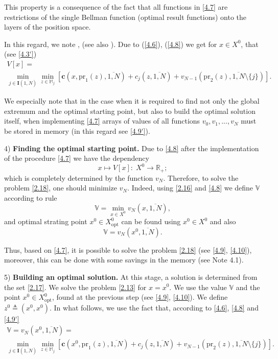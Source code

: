 \documentclass[10pt]{article}
\begin{document}
This property is a consequence of the fact
that all functions in
\eqref {4.7} are restrictions of the single Bellman function
(optimal result functions)
onto the layers of the position space.

In this regard, we note
\cite[$\S$4.9]{14}, \cite{18}
(see also \cite[(4.3.1)]{4}).
Due to (\ref{4.6}), (\ref{4.8})
we get for
$x \in X^0$,
that
(see \eqref{4.3'})
\begin{multline}
  \label{4.9'}
  V[x] = \\
  \min\limits_{j \in \mathbf{I}(\overline{1,N})} \min\limits_{z \in \mathbb{M}_j}
  [\mathbf{c}(x,\mathrm{pr}_1(z),\overline{1,N}) + c_j(z,\overline{1,N}) + v_{N-1}(\mathrm{pr}_2(z),\overline{1,N} \setminus \{j\})].
\end{multline}

We especially note that in the case
when it is required to find not only the global extremum
and the optimal starting point,
but also to build the optimal solution itself,
when implementing \eqref {4.7}
arrays of values of all functions
$v_0,v_1,...,v_N$
must be stored in memory
(in this regard see \eqref{4.9'}).

4) {\bf Finding the optimal starting point.}
Due to
\eqref{4.8}
after the implementation of the procedure
\eqref {4.7} we have the dependency
$$
  x \longmapsto V[x]:\;X^0 \longrightarrow \mathbb{R}_+;
$$
which is completely determined by the function
$v_N$.
Therefore, to solve the problem \eqref{2.18}, one should minimize
$v_N$.
Indeed,
using \eqref{2.16} and \eqref{4.8}
we define
$\mathbb{V}$
according to rule
\begin{equation}\label{4.9}
  \mathbb{V} = \min\limits_{x \in X^0} v_N(x,\overline{1,N}),
\end{equation}
and optimal strating point
$x^0 \in X^0_{\mathrm{opt}}$
can be found using
$x^0 \in X^0$ and also
\begin{equation}\label{4.10}
  \mathbb{V} = v_N(x^0,\overline{1,N}).
\end{equation}

Thus,
based on \eqref{4.7},
it is possible to
solve the problem \eqref {2.18}
(see \eqref{4.9}, \eqref {4.10}),
moreover,
this can be done with some savings in the memory
(see Note 4.1).

5) {\bf Building an optimal solution.}
At this stage, a solution is determined from the set \eqref{2.17}.
We solve the problem
\eqref{2.13}
for
$x=x^0$.
We use the value
$\mathbb{V}$
and the point
$x^0 \in X^0_{\mathrm{opt}}$,
found at the previous step
(see \eqref{4.9}, \eqref{4.10}).
We define $z^0 {\triangleq} (x^0,x^0)$.
In what follows, we use the fact that, according to
\eqref{4.6}, \eqref{4.8} and \eqref{4.9'}
\begin{multline}
  \label{4.11}
  \mathbb{V} = v_N(x^0,\overline{1,N}) = \\
  \min\limits_{j \in \mathbf{I}(\overline{1,N})}
  \min\limits_{z \in \mathbb{M}_j}
  [\mathbf{c}(x^0,\mathrm{pr}_1(z),\overline{1,N}) + c_j(z,\overline{1,N}) + v_{N-1}(\mathrm{pr}_2(z),\overline{1,N} \setminus \{j\})].
\end{multline}
\end{document}

